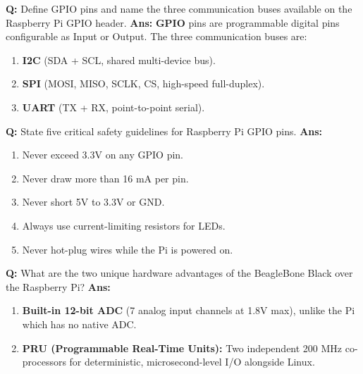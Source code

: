 \documentclass[10pt,a4paper,twocolumn]{article}
\begin{document}
\begin{tcolorbox}[
  colback=white,
  colframe=UnitColorSix,
  colbacktitle=gray!10!white,
  coltitle=black,
  fonttitle=\bfseries\sffamily\small,
  title={Unit VI $\bullet$ Card 7},
  boxrule=1.2pt,
  arc=2mm,
  outer arc=2mm,
  boxsep=1.5mm,
  top=1mm,
  bottom=1mm,
  left=1.5mm,
  right=1.5mm,
  before skip=2.5mm,
  after skip=2.5mm
]
\textbf{Q:} Define GPIO pins and name the three communication buses available on the Raspberry Pi GPIO header.
\tcbline
\textbf{Ans:} \textbf{GPIO} pins are programmable digital pins configurable as Input or Output. The three communication buses are:  
\begin{enumerate}
  \item \textbf{I2C} (SDA + SCL, shared multi-device bus).
  \item \textbf{SPI} (MOSI, MISO, SCLK, CS, high-speed full-duplex).
  \item \textbf{UART} (TX + RX, point-to-point serial).
\end{enumerate}
\end{tcolorbox}


\begin{tcolorbox}[
  colback=white,
  colframe=UnitColorSix,
  colbacktitle=gray!10!white,
  coltitle=black,
  fonttitle=\bfseries\sffamily\small,
  title={Unit VI $\bullet$ Card 8},
  boxrule=1.2pt,
  arc=2mm,
  outer arc=2mm,
  boxsep=1.5mm,
  top=1mm,
  bottom=1mm,
  left=1.5mm,
  right=1.5mm,
  before skip=2.5mm,
  after skip=2.5mm
]
\textbf{Q:} State five critical safety guidelines for Raspberry Pi GPIO pins.
\tcbline
\textbf{Ans:} \begin{enumerate}
  \item Never exceed 3.3V on any GPIO pin.
  \item Never draw more than 16 mA per pin.
  \item Never short 5V to 3.3V or GND.
  \item Always use current-limiting resistors for LEDs.
  \item Never hot-plug wires while the Pi is powered on.
\end{enumerate}
\end{tcolorbox}


\begin{tcolorbox}[
  colback=white,
  colframe=UnitColorSix,
  colbacktitle=gray!10!white,
  coltitle=black,
  fonttitle=\bfseries\sffamily\small,
  title={Unit VI $\bullet$ Card 9},
  boxrule=1.2pt,
  arc=2mm,
  outer arc=2mm,
  boxsep=1.5mm,
  top=1mm,
  bottom=1mm,
  left=1.5mm,
  right=1.5mm,
  before skip=2.5mm,
  after skip=2.5mm
]
\textbf{Q:} What are the two unique hardware advantages of the BeagleBone Black over the Raspberry Pi?
\tcbline
\textbf{Ans:} \begin{enumerate}
  \item \textbf{Built-in 12-bit ADC} (7 analog input channels at 1.8V max), unlike the Pi which has no native ADC.
  \item \textbf{PRU (Programmable Real-Time Units):} Two independent 200 MHz co-processors for deterministic, microsecond-level I/O alongside Linux.
\end{enumerate}
\end{tcolorbox}
\end{document}
